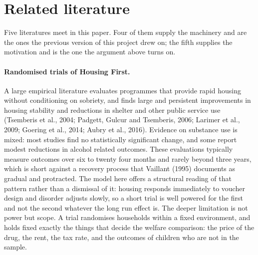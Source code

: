 \documentclass[10pt]{article}
\begin{document}
\section{Related literature}\label{sec:literature}


Five literatures meet in this paper. Four of them supply the machinery and are the
ones the previous version of this project drew on; the fifth supplies the
motivation and is the one the argument above turns on.



\paragraph{Randomised trials of Housing First.} A large empirical literature
evaluates programmes that provide rapid housing without conditioning on sobriety,
and finds large and persistent improvements in housing stability and reductions in
shelter and other public service use (Tsemberis et al., 2004; Padgett,
Gulcur and Tsemberis, 2006; Larimer et al., 2009; Goering et al., 2014; Aubry et
al., 2016). Evidence on substance use is mixed: most studies find no statistically
significant change, and some report modest reductions in alcohol related outcomes.
These evaluations typically measure outcomes over six to twenty four months and
rarely beyond three years, which is short against a recovery process that Vaillant
(1995) documents as gradual and protracted. The model here offers a structural
reading of that pattern rather than a dismissal of it: housing responds immediately
to voucher design and disorder adjusts slowly, so a short trial is well powered for
the first and not the second whatever the long run effect is. The deeper limitation
is not power but scope. A trial randomises households within a fixed environment,
and holds fixed exactly the things that decide the welfare comparison: the price of
the drug, the rent, the tax rate, and the outcomes of children who are not in the
sample.
\end{document}
